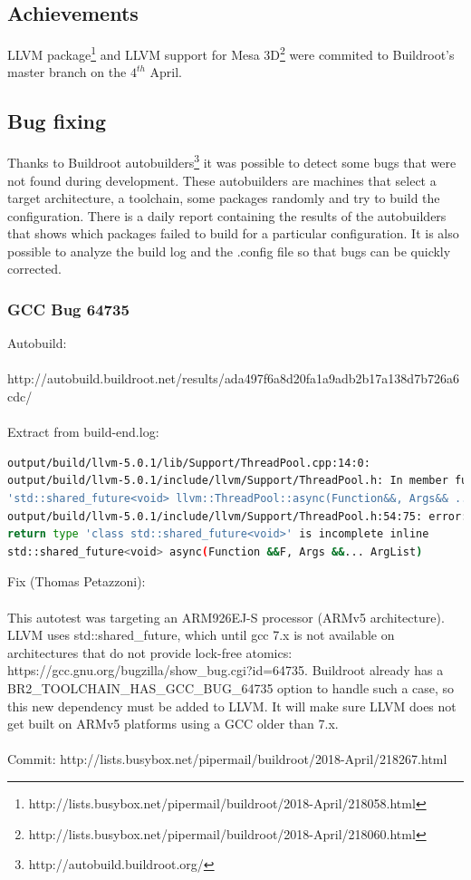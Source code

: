 \documentclass[12pt,a4paper,oneside]{article}
\begin{document}
\subsection*{Achievements}
LLVM package\footnote{http://lists.busybox.net/pipermail/buildroot/2018-April/218058.html}
and LLVM support for Mesa 3D\footnote{http://lists.busybox.net/pipermail/buildroot/2018-April/218060.html}
were commited to Buildroot's master branch on the $4^{th}$ April.
\subsection*{Bug fixing}
Thanks to Buildroot autobuilders\footnote{http://autobuild.buildroot.org/} it was
possible to detect some bugs that were not found during development. These
autobuilders are machines that select a target architecture, a toolchain, some
packages randomly and try to build the configuration. There is a daily report
containing the results of the autobuilders that shows which packages failed to
build for a particular configuration. It is also possible to analyze the build
log and the .config file so that bugs can be quickly corrected.

\subsubsection*{GCC Bug 64735}
Autobuild:\\\\
http://autobuild.buildroot.net/results/ada497f6a8d20fa1a9adb2b17a138d7b726a6cdc/\\\\
Extract from build-end.log:
\begin{lstlisting}[language=sh,keywords={}]
output/build/llvm-5.0.1/lib/Support/ThreadPool.cpp:14:0:
output/build/llvm-5.0.1/include/llvm/Support/ThreadPool.h: In member function
'std::shared_future<void> llvm::ThreadPool::async(Function&&, Args&& ...)':
output/build/llvm-5.0.1/include/llvm/Support/ThreadPool.h:54:75: error:
return type 'class std::shared_future<void>' is incomplete inline
std::shared_future<void> async(Function &&F, Args &&... ArgList)
\end{lstlisting}
Fix (Thomas Petazzoni):\\\\
This autotest was targeting an ARM926EJ-S processor (ARMv5 architecture). LLVM
uses std::shared\_future, which until gcc 7.x is not available on architectures
that do not provide lock-free atomics: https://gcc.gnu.org/bugzilla/show\_bug.cgi?id=64735.
Buildroot already has a BR2\_TOOLCHAIN\_HAS\_GCC\_BUG\_64735 option to handle such a
case, so this new dependency must be added to LLVM. It will make sure LLVM does
not get built on ARMv5 platforms using a GCC older than 7.x.\\\\
Commit: http://lists.busybox.net/pipermail/buildroot/2018-April/218267.html
\end{document}

